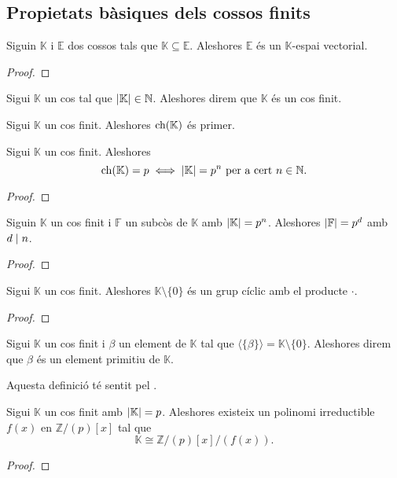 \documentclass[../Apunts.tex]{subfiles}
\begin{document}
	\subsection{Propietats bàsiques dels cossos finits}
	\begin{proposition}
		Siguin \(\mathbb{K}\) i \(\mathbb{E}\) dos cossos tals que \(\mathbb{K}\subseteq\mathbb{E}\). Aleshores \(\mathbb{E}\) és un \(\mathbb{K}\)-espai vectorial.
		\begin{proof}
		\end{proof}
	\end{proposition}
	\begin{definition}
		\label{def:cos finit}
		Sigui \(\mathbb{K}\) un cos tal que \(\abs{\mathbb{K}}\in\mathbb{N}\). Aleshores direm que \(\mathbb{K}\) és un cos finit.
	\end{definition}
	\begin{observation}
		Sigui \(\mathbb{K}\) un cos finit. Aleshores \(\operatorname{ch}(\mathbb{K})\) és primer.
	\end{observation}
	\begin{theorem}
		Sigui \(\mathbb{K}\) un cos finit. Aleshores
		\[\ch(\mathbb{K})=p\sii\abs{\mathbb{K}}=p^{n}\text{ per a cert }n\in\mathbb{N}.\]
		\begin{proof}
		\end{proof}
	\end{theorem}
	\begin{corollary}
		Siguin \(\mathbb{K}\) un cos finit i \(\mathbb{F}\) un subcòs de \(\mathbb{K}\) amb \(\abs{\mathbb{K}}=p^{n}\). Aleshores \(\abs{\mathbb{F}}=p^{d}\) amb \(d\mathrel{|} n\).
		\begin{proof}
		\end{proof}
	\end{corollary}
	\begin{theorem}
		\label{thm:teorema de l'element primitiu}
		Sigui \(\mathbb{K}\) un cos finit. Aleshores \(\mathbb{K}\setminus\{0\}\) és un grup cíclic amb el producte \(\cdot\).
		\begin{proof}
		\end{proof}
	\end{theorem}
	\begin{definition}
		\label{def:element primitiu d'un cos finit}
		Sigui \(\mathbb{K}\) un cos finit i \(\beta\) un element de \(\mathbb{K}\) tal que \(\langle\{\beta\}\rangle=\mathbb{K}\setminus\{0\}\). Aleshores direm que \(\beta\) és un element primitiu de \(\mathbb{K}\).
		
		Aquesta definició té sentit pel .
	\end{definition}
	\begin{theorem}
		Sigui \(\mathbb{K}\) un cos finit amb \(\abs{\mathbb{K}}=p\). Aleshores existeix un polinomi irreductible \(f(x)\) en \(\mathbb{Z}/(p)[x]\) tal que
		\[\mathbb{K}\cong\mathbb{Z}/(p)[x]/(f(x)).\]
		\begin{proof}
		\end{proof}
	\end{theorem}
\end{document}
